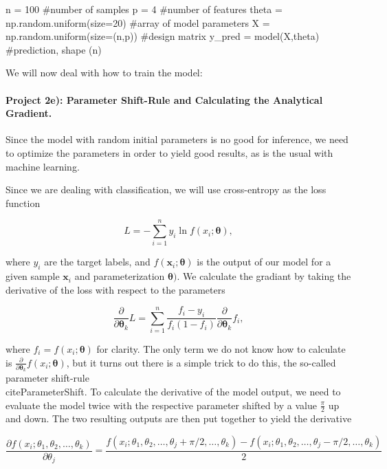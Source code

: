 \documentclass[%
oneside,                 %
final,                   %
10pt]{article}
\begin{document}
\begin{print}
n = 100 #number of samples
p = 4 #number of features
theta = np.random.uniform(size=20) #array of model parameters
X = np.random.uniform(size=(n,p)) #design matrix
y_pred = model(X,theta) #prediction, shape (n)
\end{print}



We will now deal with how to train the model:

\paragraph{Project 2e): Parameter Shift-Rule and Calculating the Analytical Gradient.}
Since the model with random initial parameters is no good for
inference, we need to optimize the parameters in order to yield good
results, as is the usual with machine learning.

Since we are dealing with classification, we will use cross-entropy as the loss function

\begin{equation*}
    L = -\sum_{i=1}^{n}{y_i \ln{f(x_i;\boldsymbol{\theta})}},
\end{equation*}

where $y_i$ are the target labels, and
$f(\boldsymbol{x}_i;\boldsymbol{\theta})$ is the output of our model
for a given sample $\boldsymbol{x}_i$ and parameterization
$\boldsymbol{\theta})$. We calculate the gradiant by taking the
derivative of the loss with respect to the parameters

\begin{equation*}
    \frac{\partial}{\partial \boldsymbol{\theta}_k}L = \sum_{i=1}^{n}{\frac{f_i - y_i}{f_i(1 - f_i)}} \frac{\partial}{\partial \boldsymbol{\theta}_k}f_i,
\end{equation*}

where $f_i = f(x_i;\boldsymbol{\theta})$ for clarity. The only term we do not know how to calculate is $\frac{\partial}{\partial \boldsymbol{\theta}_k}f(x_i;\boldsymbol{\theta})$, but it turns out there is a simple trick to do this, the so-called parameter shift-rule \\cite{ParameterShift}. To calculate the derivative of the model output, we need to evaluate the model twice with the respective parameter shifted by a value $\frac{\pi}{2}$ up and down. The two resulting outputs are then put together to yield the derivative



\begin{equation*}
    \frac{\partial f(x_i; \theta_1, \theta_2, \dots, \theta_k)}{\partial \theta_j}  = \frac{f(x_i; \theta_1, \theta_2, \dots, \theta_j + \pi /2, \dots, \theta_k) -f(x_i; \theta_1, \theta_2, \dots, \theta_j - \pi /2, \dots, \theta_k)}{2}
\end{equation*}
\end{document}
